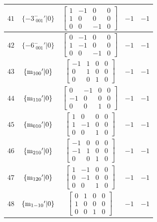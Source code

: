 \documentclass[fleqn,8pt]{jsarticle}
\begin{document}
\begin{longtable}{ccccc}
$ 41 $ & $ \{-3^{-}_{\,\,001}{}'|0\} $ & $ \begin{bmatrix} 1 & -1 & 0 & 0 \\ 1 & 0 & 0 & 0 \\ 0 & 0 & -1 & 0 \end{bmatrix} $ & $ -1 $ & $ -1 $ \\ \hline
$ 42 $ & $ \{-6^{-}_{\,\,001}{}'|0\} $ & $ \begin{bmatrix} 0 & -1 & 0 & 0 \\ 1 & -1 & 0 & 0 \\ 0 & 0 & -1 & 0 \end{bmatrix} $ & $ -1 $ & $ -1 $ \\ \hline
$ 43 $ & $ \{{\rm m}_{100}{}'|0\} $ & $ \begin{bmatrix} -1 & 1 & 0 & 0 \\ 0 & 1 & 0 & 0 \\ 0 & 0 & 1 & 0 \end{bmatrix} $ & $ -1 $ & $ -1 $ \\ \hline
$ 44 $ & $ \{{\rm m}_{110}{}'|0\} $ & $ \begin{bmatrix} 0 & -1 & 0 & 0 \\ -1 & 0 & 0 & 0 \\ 0 & 0 & 1 & 0 \end{bmatrix} $ & $ -1 $ & $ -1 $ \\ \hline
$ 45 $ & $ \{{\rm m}_{010}{}'|0\} $ & $ \begin{bmatrix} 1 & 0 & 0 & 0 \\ 1 & -1 & 0 & 0 \\ 0 & 0 & 1 & 0 \end{bmatrix} $ & $ -1 $ & $ -1 $ \\ \hline
$ 46 $ & $ \{{\rm m}_{210}{}'|0\} $ & $ \begin{bmatrix} -1 & 0 & 0 & 0 \\ -1 & 1 & 0 & 0 \\ 0 & 0 & 1 & 0 \end{bmatrix} $ & $ -1 $ & $ -1 $ \\ \hline
$ 47 $ & $ \{{\rm m}_{120}{}'|0\} $ & $ \begin{bmatrix} 1 & -1 & 0 & 0 \\ 0 & -1 & 0 & 0 \\ 0 & 0 & 1 & 0 \end{bmatrix} $ & $ -1 $ & $ -1 $ \\ \hline
$ 48 $ & $ \{{\rm m}_{1-10}{}'|0\} $ & $ \begin{bmatrix} 0 & 1 & 0 & 0 \\ 1 & 0 & 0 & 0 \\ 0 & 0 & 1 & 0 \end{bmatrix} $ & $ -1 $ & $ -1 $ \\
\end{longtable}
\end{document}
